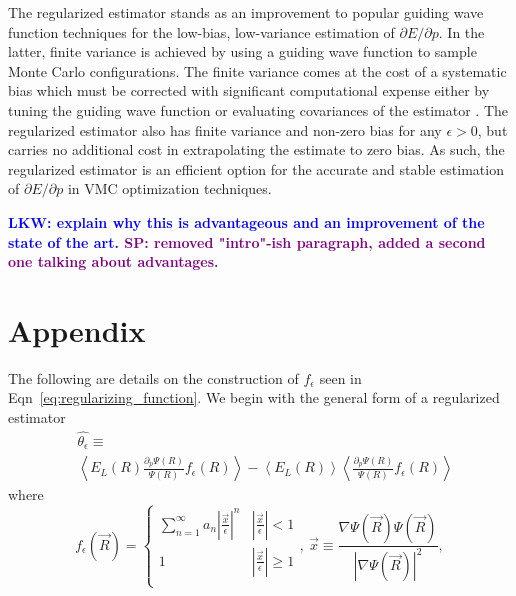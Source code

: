 \documentclass[twocolumn]{revtex4-1}
\newcommand{\lucas}[1]{\textbf{\textcolor{blue}{LKW: #1}}}
\newcommand{\shivesh}[1]{\textbf{\textcolor{purple}{SP: #1}}}
\begin{document}
The regularized estimator stands as an improvement to popular guiding wave function techniques \cite{Avella, Attaccalite2008, Zen2013, Assaraf1999, doi:10.1063/1.1286598, Assaraf2003} for the low-bias, low-variance estimation of $\partial E/\partial p$.
In the latter, finite variance is achieved by using a guiding wave function to sample Monte Carlo configurations.
The finite variance comes at the cost of a systematic bias which must be corrected with significant computational expense either by tuning the guiding wave function or evaluating covariances of the estimator \cite{ Toulouse2015}.
The regularized estimator also has finite variance and non-zero bias for any $\epsilon > 0$, but carries no additional cost in extrapolating the estimate to zero bias.
As such, the regularized estimator is an efficient option for the accurate and stable estimation of $\partial E/\partial p$ in VMC optimization techniques.

\lucas{explain why this is advantageous and an improvement of the state of the art. }
\shivesh{removed "intro"-ish paragraph, added a second one talking about advantages.}

%


\section{Appendix}
The following are details on the construction of $f_\epsilon$ seen in Eqn~\ref{eq:regularizing_function}. 
We begin with the general form of a regularized estimator
\begin{equation}
\begin{split}
&\hat{\theta_\epsilon} \equiv \\ 
&\left\langle E_L(R) \frac{\partial_p \Psi(R)}{\Psi(R)} f_\epsilon(R) \right\rangle - \left\langle E_L(R) \right \rangle \left \langle \frac{\partial_p \Psi(R)}{\Psi(R)} f_\epsilon(R) \right\rangle
\label{eq:regularized_estimator}
\end{split}
\end{equation}
where 
\begin{equation}
f_\epsilon(\vec{R}) = \begin{cases} 
      \sum_{n=1}^{\infty} a_n |\frac{\vec{x}}{\epsilon}|^n & |\frac{\vec{x}}{\epsilon}| < 1 \\
      1 & |\frac{\vec{x}}{\epsilon}| \ge 1 \\
   \end{cases},\ \vec{x} \equiv \frac{\nabla \Psi(\vec{R}) \Psi(\vec{R})}{|\nabla \Psi(\vec{R})|^2},
\label{eq:regularizing_function}
\end{equation} 
\end{document}
